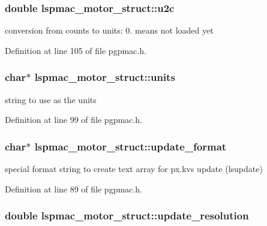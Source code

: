 \hypertarget{structlspmac__motor__struct_a61415627ab2dc0f438b190d117e532db}{
\subsubsection[{u2c}]{\setlength{\rightskip}{0pt plus 5cm}double lspmac\-\_\-motor\-\_\-struct\-::u2c}}\label{structlspmac__motor__struct_a61415627ab2dc0f438b190d117e532db}


conversion from counts to units\-: 0. means not loaded yet 



Definition at line 105 of file pgpmac.\-h.

\hypertarget{structlspmac__motor__struct_a82bceff2ae698b4b9618360b446aec08}{
\subsubsection[{units}]{\setlength{\rightskip}{0pt plus 5cm}char$\ast$ lspmac\-\_\-motor\-\_\-struct\-::units}}\label{structlspmac__motor__struct_a82bceff2ae698b4b9618360b446aec08}


string to use as the units 



Definition at line 99 of file pgpmac.\-h.

\hypertarget{structlspmac__motor__struct_a514ee9ed48c7171157d579623f7de23f}{
\subsubsection[{update\-\_\-format}]{\setlength{\rightskip}{0pt plus 5cm}char$\ast$ lspmac\-\_\-motor\-\_\-struct\-::update\-\_\-format}}\label{structlspmac__motor__struct_a514ee9ed48c7171157d579623f7de23f}


special format string to create text array for px.\-kvs update (lsupdate) 



Definition at line 89 of file pgpmac.\-h.

\hypertarget{structlspmac__motor__struct_a18386126b724d9c7f72364db126f5b93}{
\subsubsection[{update\-\_\-resolution}]{\setlength{\rightskip}{0pt plus 5cm}double lspmac\-\_\-motor\-\_\-struct\-::update\-\_\-resolution}}\label{structlspmac__motor__struct_a18386126b724d9c7f72364db126f5b93}


